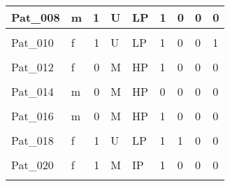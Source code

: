 \documentclass[11pt, a4paper, twosided]{book}
\begin{document}
\begin{longtable}[t]{l|l|r|l|l|l|l|l|l}
\hline
Pat\_008 & m & 1 & U & LP & 1 & 0 & 0 & 0\\
\hline
\cellcolor[HTML]{E2E868}{Pat\_009} & \cellcolor[HTML]{E2E868}{m} & \cellcolor[HTML]{E2E868}{1} & \cellcolor[HTML]{E2E868}{U} & \cellcolor[HTML]{E2E868}{LP} & \cellcolor[HTML]{E2E868}{1} & \cellcolor[HTML]{E2E868}{0} & \cellcolor[HTML]{E2E868}{0} & \cellcolor[HTML]{E2E868}{1}\\
\hline
Pat\_010 & f & 1 & U & LP & 1 & 0 & 0 & 1\\
\hline
\cellcolor[HTML]{E2E868}{Pat\_011} & \cellcolor[HTML]{E2E868}{f} & \cellcolor[HTML]{E2E868}{0} & \cellcolor[HTML]{E2E868}{U} & \cellcolor[HTML]{E2E868}{NA} & \cellcolor[HTML]{E2E868}{0} & \cellcolor[HTML]{E2E868}{0} & \cellcolor[HTML]{E2E868}{1} & \cellcolor[HTML]{E2E868}{0}\\
\hline
Pat\_012 & f & 0 & M & HP & 1 & 0 & 0 & 0\\
\hline
\cellcolor[HTML]{E2E868}{Pat\_013} & \cellcolor[HTML]{E2E868}{f} & \cellcolor[HTML]{E2E868}{1} & \cellcolor[HTML]{E2E868}{U} & \cellcolor[HTML]{E2E868}{IP} & \cellcolor[HTML]{E2E868}{1} & \cellcolor[HTML]{E2E868}{1} & \cellcolor[HTML]{E2E868}{0} & \cellcolor[HTML]{E2E868}{0}\\
\hline
Pat\_014 & m & 0 & M & HP & 0 & 0 & 0 & 0\\
\hline
\cellcolor[HTML]{E2E868}{Pat\_015} & \cellcolor[HTML]{E2E868}{m} & \cellcolor[HTML]{E2E868}{0} & \cellcolor[HTML]{E2E868}{M} & \cellcolor[HTML]{E2E868}{HP} & \cellcolor[HTML]{E2E868}{1} & \cellcolor[HTML]{E2E868}{0} & \cellcolor[HTML]{E2E868}{0} & \cellcolor[HTML]{E2E868}{0}\\
\hline
Pat\_016 & m & 0 & M & HP & 1 & 0 & 0 & 0\\
\hline
\cellcolor[HTML]{E2E868}{Pat\_017} & \cellcolor[HTML]{E2E868}{m} & \cellcolor[HTML]{E2E868}{0} & \cellcolor[HTML]{E2E868}{M} & \cellcolor[HTML]{E2E868}{NA} & \cellcolor[HTML]{E2E868}{1} & \cellcolor[HTML]{E2E868}{0} & \cellcolor[HTML]{E2E868}{0} & \cellcolor[HTML]{E2E868}{0}\\
\hline
Pat\_018 & f & 1 & U & LP & 1 & 1 & 0 & 0\\
\hline
\cellcolor[HTML]{E2E868}{Pat\_019} & \cellcolor[HTML]{E2E868}{m} & \cellcolor[HTML]{E2E868}{0} & \cellcolor[HTML]{E2E868}{M} & \cellcolor[HTML]{E2E868}{HP} & \cellcolor[HTML]{E2E868}{1} & \cellcolor[HTML]{E2E868}{0} & \cellcolor[HTML]{E2E868}{0} & \cellcolor[HTML]{E2E868}{0}\\
\hline
Pat\_020 & f & 1 & M & IP & 1 & 0 & 0 & 0\\
\hline
\cellcolor[HTML]{E2E868}{Pat\_021} & \cellcolor[HTML]{E2E868}{m} & \cellcolor[HTML]{E2E868}{0} & \cellcolor[HTML]{E2E868}{U} & \cellcolor[HTML]{E2E868}{LP} & \cellcolor[HTML]{E2E868}{0} & \cellcolor[HTML]{E2E868}{0} & \cellcolor[HTML]{E2E868}{0} & \cellcolor[HTML]{E2E868}{1}\\

\end{longtable}
\end{document}

